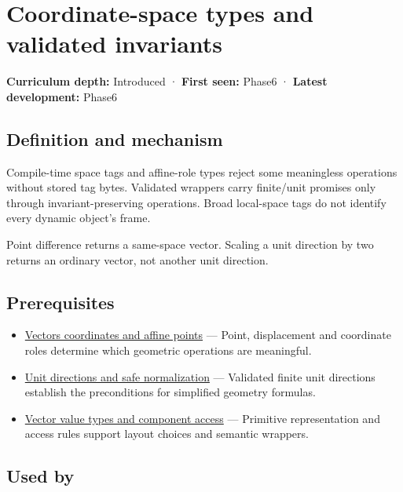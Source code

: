 \hypertarget{appendix-380a220e2529}{}\label{referencestart:appendix-380a220e2529}
\section{Coordinate-space types and validated invariants}\label{appendix-380a220e2529-coordinate-space-types-and-validated-invariants}

\textbf{Curriculum depth:} Introduced · \textbf{First seen:} Phase6 · \textbf{Latest development:} Phase6

\subsection{Definition and mechanism}\label{appendix-380a220e2529-definition-and-mechanism}

Compile-time space tags and affine-role types reject some meaningless operations without stored tag bytes. Validated wrappers carry finite/unit promises only through invariant-preserving operations. Broad local-space tags do not identify every dynamic object's frame.

Point difference returns a same-space vector. Scaling a unit direction by two returns an ordinary vector, not another unit direction.

\subsection{Prerequisites}\label{appendix-380a220e2529-prerequisites}

\begin{itemize}
\tightlist
\item
  \hyperref[appendix-0659864c0aa3]{Vectors coordinates and affine points} --- Point, displacement and coordinate roles determine which geometric operations are meaningful.
\item
  \hyperref[appendix-f744e41b95b4]{Unit directions and safe normalization} --- Validated finite unit directions establish the preconditions for simplified geometry formulas.
\item
  \hyperref[appendix-37a39984ba66]{Vector value types and component access} --- Primitive representation and access rules support layout choices and semantic wrappers.
\end{itemize}

\subsection{Used by}\label{appendix-380a220e2529-used-by}

